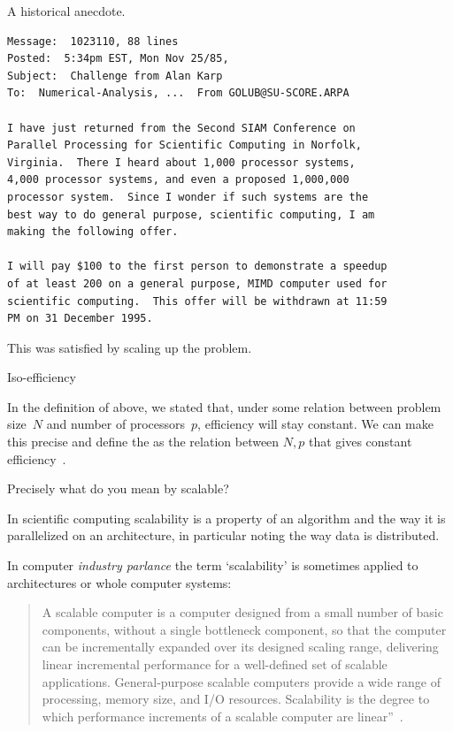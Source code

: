 \begin{remark}
  A historical anecdote.
  
\begin{verbatim}
Message:  1023110, 88 lines
Posted:  5:34pm EST, Mon Nov 25/85,
Subject:  Challenge from Alan Karp
To:  Numerical-Analysis, ...  From GOLUB@SU-SCORE.ARPA

I have just returned from the Second SIAM Conference on
Parallel Processing for Scientific Computing in Norfolk,
Virginia.  There I heard about 1,000 processor systems,
4,000 processor systems, and even a proposed 1,000,000
processor system.  Since I wonder if such systems are the
best way to do general purpose, scientific computing, I am
making the following offer.

I will pay $100 to the first person to demonstrate a speedup
of at least 200 on a general purpose, MIMD computer used for
scientific computing.  This offer will be withdrawn at 11:59
PM on 31 December 1995.
\end{verbatim}

This was satisfied by scaling up the problem.
\end{remark}

 {Iso-efficiency}
\label{sec:iso-efficiency}

In the definition of  above, we stated
that, under some relation between problem size~$N$ and number of
processors~$p$, efficiency will stay constant. We can make this
precise and define the  as the
relation between $N,p$ that gives constant
efficiency~\cite{Grama:1993:isoefficiency}.

 {Precisely what do you mean by scalable?}

In scientific computing
scalability is a property of an algorithm and the way it is
parallelized on an architecture, in
particular noting the way data is distributed.

In computer
\emph{industry parlance}
the term `scalability' is sometimes
applied to architectures or whole computer systems:
\begin{quote}
  A
  scalable computer is a computer designed from a small number of
  basic components, without a single bottleneck component, so that
  the computer can be incrementally expanded over its designed scaling
  range, delivering linear incremental performance for a well-defined
  set of scalable applications.  General-purpose scalable computers
  provide a wide range of processing, memory size, and I/O
  resources.  Scalability is the degree to which performance
  increments of a scalable computer are linear''~\cite{Bell:outlook}.
\end{quote}

